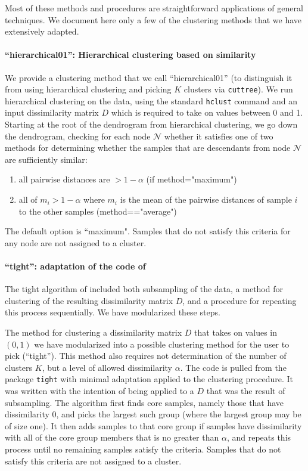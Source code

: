 Most of these methods and procedures are straightforward applications of general techniques. We document here only a few of the clustering methods that we have extensively adapted. 

\paragraph{``hierarchical01'': Hierarchical clustering based on similarity} We provide a clustering method that we call ``hierarchical01'' (to distinguish it from using hierarchical clustering and picking $K$ clusters via \texttt{cuttree}). We run hierarchical clustering on the data, using the standard \texttt{hclust} command and an input dissimilarity matrix $D$ which is required to take on values between 0 and 1. Starting at the root of the dendrogram from hierarchical clustering, we go down the dendrogram, checking for each node $\mathcal{N}$ whether it satisfies one of two methods for determining whether the samples that are descendants from node $\mathcal{N}$ are sufficiently similar:
\begin{enumerate}
	\item 	all pairwise distances are $>1-\alpha$ (if method="maximum")
	\item  all of $m_i>1-\alpha$ where $m_i$ is the mean of the pairwise distances of sample $i$ to the other samples (method=="average")
\end{enumerate}
The default option is ``maximum". Samples that do not satisfy this criteria for any node are not assigned to a cluster.

\paragraph{``tight'': adaptation of the code of \cite{Tseng:2005ir}}
The tight algorithm of \cite{Tseng:2005ir} included both subsampling of the data, a method for clustering of the resulting dissimilarity matrix $D$, and a procedure for repeating this process sequentially. We have modularized these steps. 

The method for clustering a dissimilarity matrix $D$ that takes on values in $(0,1)$ we have modularized into a possible clustering method for the user to pick (``tight''). This method also requires not determination of the number of clusters $K$, but a level of allowed dissimilarity $\alpha$. The code is pulled from the package \texttt{tight} with minimal adaptation applied to the clustering procedure. It was written with the intention of being applied to a $D$ that was the result of subsampling. The  algorithm first finds core samples, namely those that have dissimilarity 0, and picks the largest such group (where the largest group may be of size one). It then adds samples to that core group if samples have dissimilarity with all of the core group members that is no greater than $\alpha$, and repeats this process until no remaining samples satisfy the criteria. Samples that do not satisfy this criteria are not assigned to a cluster.


